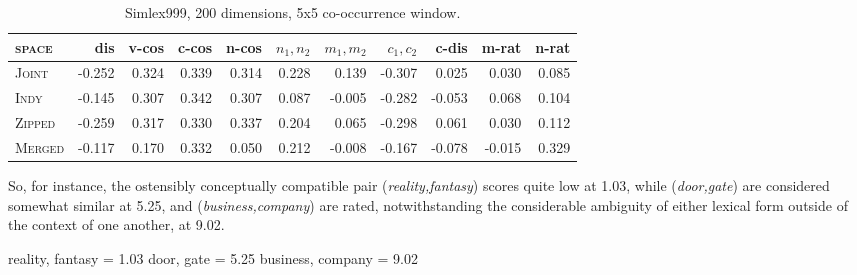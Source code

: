 \begin{table}
\begin{tabular}{lrrrrrrrrrr}
\hline
\textsc{space} & dis & v-cos & c-cos & n-cos & $n_1,n_2$ & $m_1,m_2$ & $c_1,c_2$ & c-dis & m-rat & n-rat \\
\hline
\textsc{Joint} & -0.252 & 0.324 & 0.339 & 0.314 & 0.228 & 0.139 & -0.307 & 0.025 & 0.030 & 0.085 \\
\textsc{Indy} & -0.145 & 0.307 & 0.342 & 0.307 & 0.087 & -0.005 & -0.282 & -0.053 & 0.068 & 0.104 \\
\textsc{Zipped} & -0.259 & 0.317 & 0.330 & 0.337 & 0.204 & 0.065 & -0.298 & 0.061 & 0.030 & 0.112 \\
\textsc{Merged} & -0.117 & 0.170 & 0.332 & 0.050 & 0.212 & -0.008 & -0.167 & -0.078 & -0.015 & 0.329 \\
\hline
\end{tabular}
\caption{Simlex999, 200 dimensions, 5x5 co-occurrence window.}
\end{table}

So, for instance, the ostensibly conceptually compatible pair (\emph{reality,fantasy}) scores quite low at 1.03, while (\emph{door,gate}) are considered somewhat similar at 5.25, and (\emph{business,company}) are rated, notwithstanding the considerable ambiguity of either lexical form outside of the context of one another, at 9.02.

reality, fantasy = 1.03
door, gate = 5.25
business, company = 9.02